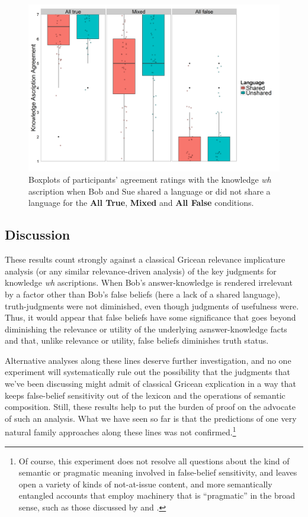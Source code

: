\documentclass[a4paper]{article}
\begin{document}
\begin{figure}[h!]
\centering
\includegraphics[width=14cm] {Fig4b}
\captionsetup{width=0.9\textwidth}
\caption{Boxplots of participants' agreement ratings with the knowledge \textit{wh} ascription when Bob and Sue shared a language or did not share a language for the \textbf{All True}, \textbf{Mixed} and \textbf{All False} conditions.}
\label{fig:Fig5}
\end{figure}


\subsection{Discussion}
These results count strongly against a classical Gricean relevance implicature analysis (or any similar relevance-driven analysis) of the key judgments for knowledge \textit{wh} ascriptions. When Bob's answer-knowledge is rendered irrelevant by a factor other than Bob's false beliefs (here a lack of a shared language), truth-judgments were not diminished, even though judgments of usefulness were. Thus, it would appear that false beliefs have some significance that goes beyond diminishing the relevance or utility of the underlying asnswer-knowledge facts and that, unlike relevance or utility, false beliefs diminishes truth status.

Alternative analyses along these lines deserve further investigation, and no one experiment will systematically rule out the possibility that the judgments that we've been discussing might admit of classical Gricean explication in a way that keeps false-belief sensitivity out of the lexicon and the operations of semantic composition. Still, these results help to put the burden of proof on the advocate of such an analysis. What we have seen so far is that the predictions of one very natural family approaches along these lines was not confirmed.\footnote{Of course, this experiment  does not resolve all questions about the kind of semantic or pragmatic meaning involved in false-belief sensitivity, and leaves open a variety of kinds of not-at-issue content, and more semantically entangled accounts that employ machinery that is ``pragmatic'' in the broad sense, such as those discussed by \citet{cremers:plurality} and \citet{xiang:sub:16}.} 
\end{document}
